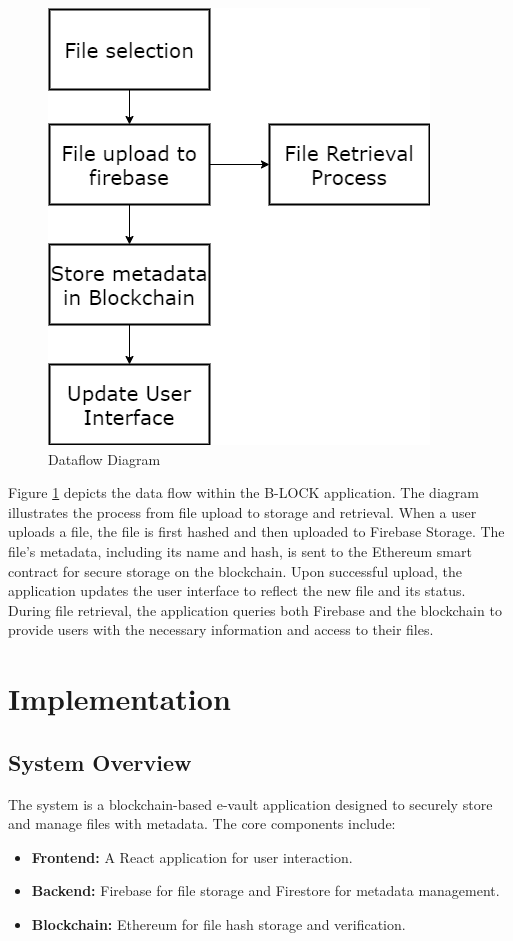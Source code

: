 \documentclass[12pt,a4paper]{report}
\begin{document}
\begin{figure}[hbtp]
\centering
\includegraphics[scale=0.7]{./pic/dataflow.png}
\caption{Dataflow Diagram}
\label{fig:dataflow}
\end{figure}
Figure \ref{fig:dataflow} depicts the data flow within the B-LOCK application. The diagram illustrates the process from file upload to storage and retrieval. When a user uploads a file, the file is first hashed and then uploaded to Firebase Storage. The file's metadata, including its name and hash, is sent to the Ethereum smart contract for secure storage on the blockchain. Upon successful upload, the application updates the user interface to reflect the new file and its status. During file retrieval, the application queries both Firebase and the blockchain to provide users with the necessary information and access to their files.



\chapter{Implementation}
\section{System Overview}
\par
The system is a blockchain-based e-vault application designed to securely store and manage files with metadata. The core components include:
\begin{itemize}
   \item \textbf{Frontend:} A React application for user interaction.
   \item \textbf{Backend:} Firebase for file storage and Firestore for metadata management.
   \item \textbf{Blockchain:} Ethereum for file hash storage and verification.
\end{itemize}
\end{document}

